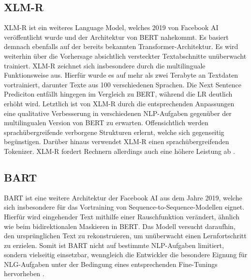 \subsection{XLM-R}
\noindent
\ac{XLM-R} ist ein weiteres Language Model, welches 2019 von Facebook AI veröffentlicht wurde und der Architektur von \ac{BERT} nahekommt. Es basiert demnach ebenfalls auf der bereits bekannten Transformer-Architektur. Es wird weiterhin über die Vorhersage absichtlich versteckter Textabschnitte unüberwacht trainiert. \ac{XLM-R} zeichnet sich insbesondere durch die multilinguale Funktionsweise aus. Hierfür wurde es auf mehr als zwei Terabyte an Textdaten vortrainiert, darunter Texte aus 100 verschiedenen Sprachen. Die Next Sentence Prediciton entfällt hingegen im Vergleich zu \ac{BERT}, während die \ac{LR} deutlich erhöht wird. Letztlich ist von \ac{XLM-R} durch die entsprechenden Anpassungen eine qualitative Verbesserung in verschiedenen \ac{NLP}-Aufgaben gegenüber der multilingualen Version von \ac{BERT} zu erwarten. Offensichtlich werden sprachübergreifende verborgene Strukturen erlernt, welche sich gegenseitig begünstigen. Darüber hinaus verwendet \ac{XLM-R} einen sprachübergreifenden Tokenizer. \ac{XLM-R} fordert Rechnern allerdings auch eine höhere Leistung ab \cite{CON20}.


\subsection{BART}
\noindent
\ac{BART} ist eine weitere Architektur der Facebook AI aus dem Jahre 2019, welche sich insbesondere für das Vortraining von Sequence-to-Sequence-Modellen eignet. Hierfür wird eingehender Text mithilfe einer Rauschfunktion verändert, ähnlich wie beim bidirektionalen Maskieren in \ac{BERT}. Das Modell versucht daraufhin, den ursprünglichen Text zu rekonstruieren, um unüberwacht einen Lernfortschritt zu erzielen. Somit ist \ac{BART} nicht auf bestimmte \ac{NLP}-Aufgaben limitiert, sondern vielseitig einsetzbar, wenngleich die Entwickler die besondere Eignung für \ac{NLG}-Aufgaben unter der Bedingung eines entsprechenden Fine-Tunings hervorheben \cite[S.~1]{LEW19}.\\


